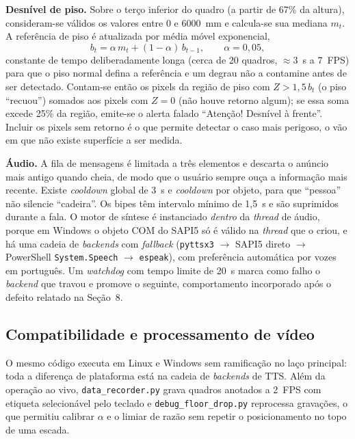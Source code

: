 \documentclass[12pt]{article}
\begin{document}
\textbf{Desnível de piso.} Sobre o terço inferior do quadro (a partir de 67\%
da altura), consideram-se válidos os valores entre 0 e 6000~mm e calcula-se sua
mediana $m_t$. A referência de piso é atualizada por média móvel exponencial,
\begin{equation}
b_t = \alpha\,m_t + (1-\alpha)\,b_{t-1}, \qquad \alpha = 0{,}05,
\end{equation}
constante de tempo deliberadamente longa (cerca de 20 quadros, $\approx 3$~s
a 7~FPS) para que o piso normal defina a referência e um degrau não a contamine
antes de ser detectado. Contam-se então os pixels da região de piso com
$Z > 1{,}5\,b_t$ (o piso ``recuou'') somados aos pixels com $Z = 0$ (não houve
retorno algum); se essa soma excede 25\% da região, emite-se o alerta falado
``Atenção! Desnível à frente''. Incluir os pixels sem retorno é o que permite
detectar o caso mais perigoso, o vão em que não existe superfície a ser
medida.

\textbf{Áudio.} A fila de mensagens é limitada a três elementos e descarta o
anúncio mais antigo quando cheia, de modo que o usuário sempre ouça a
informação mais recente. Existe \textit{cooldown} global de 3~s e
\textit{cooldown} por objeto, para que ``pessoa'' não silencie ``cadeira''.
Os bipes têm intervalo mínimo de 1,5~s e são suprimidos durante a fala. O
motor de síntese é instanciado \emph{dentro} da \textit{thread} de áudio,
porque em Windows o objeto COM do SAPI5 só é válido na \textit{thread} que o
criou, e há uma cadeia de \textit{backends} com \textit{fallback}
(\texttt{pyttsx3} $\rightarrow$ SAPI5 direto $\rightarrow$ PowerShell
\texttt{System.Speech} $\rightarrow$ \texttt{espeak}), com preferência
automática por vozes em português. Um \textit{watchdog} com tempo limite de
20~s marca como falho o \textit{backend} que travou e promove o seguinte,
comportamento incorporado após o defeito relatado na Seção~8.

\subsection{Compatibilidade e processamento de vídeo}

O mesmo código executa em Linux e Windows sem ramificação no laço principal:
toda a diferença de plataforma está na cadeia de \textit{backends} de TTS.
Além da operação ao vivo, \texttt{data\_recorder.py} grava quadros anotados a
2~FPS com etiqueta selecionável pelo teclado e \texttt{debug\_floor\_drop.py}
reprocessa gravações, o que permitiu calibrar $\alpha$ e o limiar de razão sem
repetir o posicionamento no topo de uma escada.
\end{document}
